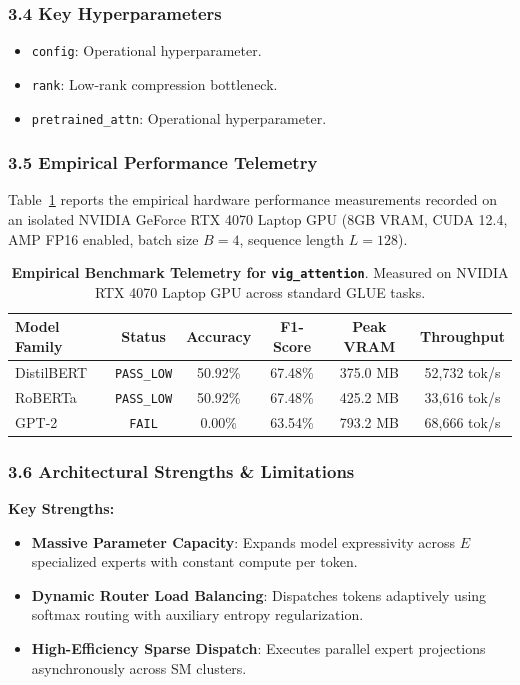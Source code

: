 \subsubsection*{3.4 Key Hyperparameters}
\begin{itemize}
    \item \texttt{config}: Operational hyperparameter.
    \item \texttt{rank}: Low-rank compression bottleneck.
    \item \texttt{pretrained\_attn}: Operational hyperparameter.
\end{itemize}

\subsubsection*{3.5 Empirical Performance Telemetry}
Table~\ref{tab:telemetry_vig_attention} reports the empirical hardware performance measurements recorded on an isolated NVIDIA GeForce RTX 4070 Laptop GPU (8GB VRAM, CUDA 12.4, AMP FP16 enabled, batch size $B=4$, sequence length $L=128$).

\begin{table}[h]
\centering
\small
\caption{\textbf{Empirical Benchmark Telemetry for \texttt{vig\_attention}}. Measured on NVIDIA RTX 4070 Laptop GPU across standard GLUE tasks.}
\label{tab:telemetry_vig_attention}
\begin{tabular*}{\columnwidth}{@{\extracolsep{\fill}}lccccc}
\toprule
\textbf{Model Family} & \textbf{Status} & \textbf{Accuracy} & \textbf{F1-Score} & \textbf{Peak VRAM} & \textbf{Throughput} \\
\midrule
DistilBERT & \texttt{PASS\_LOW} & 50.92\% & 67.48\% & 375.0 MB & 52,732 tok/s \\
RoBERTa & \texttt{PASS\_LOW} & 50.92\% & 67.48\% & 425.2 MB & 33,616 tok/s \\
GPT-2 & \texttt{FAIL} & 0.00\% & 63.54\% & 793.2 MB & 68,666 tok/s \\
\bottomrule
\end{tabular*}
\end{table}

\subsubsection*{3.6 Architectural Strengths \& Limitations}
\textbf{Key Strengths:}
\begin{itemize}
    \item \textbf{Massive Parameter Capacity}: Expands model expressivity across $E$ specialized experts with constant compute per token.
    \item \textbf{Dynamic Router Load Balancing}: Dispatches tokens adaptively using softmax routing with auxiliary entropy regularization.
    \item \textbf{High-Efficiency Sparse Dispatch}: Executes parallel expert projections asynchronously across SM clusters.
\end{itemize}

